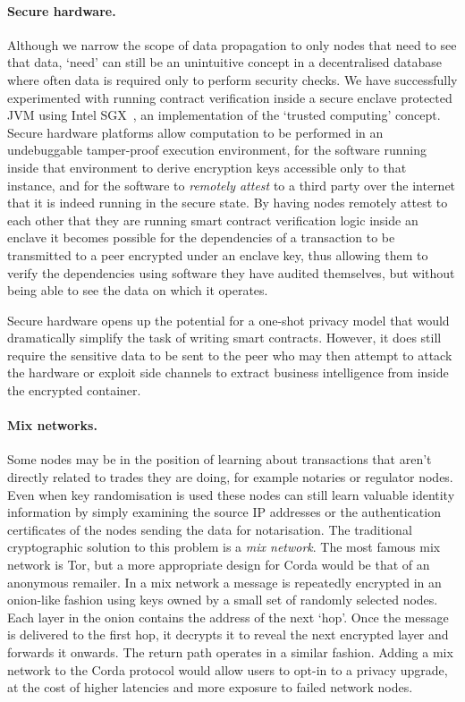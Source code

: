 \documentclass{article}
\begin{document}
\paragraph{Secure hardware.}Although we narrow the scope of data propagation to only nodes that need to see that
data, `need' can still be an unintuitive concept in a decentralised database where often data is required only to
perform security checks. We have successfully experimented with running contract verification inside a secure
enclave protected JVM using Intel SGX\texttrademark~, an implementation of the `trusted computing'
concept\cite{mitchell2005trusted}. Secure hardware platforms allow computation to be performed in an undebuggable
tamper-proof execution environment, for the software running inside that environment to derive encryption keys
accessible only to that instance, and for the software to \emph{remotely attest} to a third party over the internet
that it is indeed running in the secure state. By having nodes remotely attest to each other that they are running
smart contract verification logic inside an enclave it becomes possible for the dependencies of a transaction to be
transmitted to a peer encrypted under an enclave key, thus allowing them to verify the dependencies using software
they have audited themselves, but without being able to see the data on which it operates.

Secure hardware opens up the potential for a one-shot privacy model that would dramatically simplify the task of
writing smart contracts. However, it does still require the sensitive data to be sent to the peer who may then
attempt to attack the hardware or exploit side channels to extract business intelligence from inside the encrypted
container.

\paragraph{Mix networks.}Some nodes may be in the position of learning about transactions that aren't directly
related to trades they are doing, for example notaries or regulator nodes. Even when key randomisation is used
these nodes can still learn valuable identity information by simply examining the source IP addresses or the
authentication certificates of the nodes sending the data for notarisation. The traditional cryptographic solution
to this problem is a \emph{mix network}\cite{Chaum:1981:UEM:358549.358563}. The most famous mix network is Tor, but
a more appropriate design for Corda would be that of an anonymous remailer. In a mix network a message is
repeatedly encrypted in an onion-like fashion using keys owned by a small set of randomly selected nodes. Each
layer in the onion contains the address of the next `hop'. Once the message is delivered to the first hop, it
decrypts it to reveal the next encrypted layer and forwards it onwards. The return path operates in a similar
fashion. Adding a mix network to the Corda protocol would allow users to opt-in to a privacy upgrade, at the cost
of higher latencies and more exposure to failed network nodes.
\end{document}
